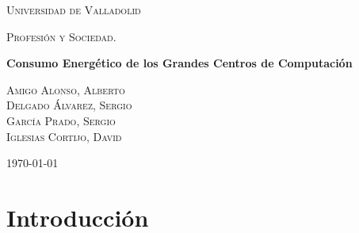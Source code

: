 \documentclass[10pt]{article}
\begin{document}
	\begin{titlepage}
      \centering
          {\scshape\LARGE Universidad de Valladolid \par}
          \vspace{1cm}
          {\scshape\Large Profesión y Sociedad.\par}
          \vspace{1.5cm}
          {\huge\bfseries Consumo Energético de los Grandes Centros de Computación \par}
          \vspace{2cm}
          {\large
          \textsc{Amigo Alonso, Alberto}\\[2mm] %
          \textsc{Delgado Álvarez, Sergio}\\[2mm] %
          \textsc{García Prado, Sergio}\\[2mm] %
          \textsc{Iglesias Cortijo, David}\\[2mm] %

          \vspace{-5mm}
          }

          \vfill
		{\large \today\par}
	\end{titlepage}


	\clearpage
	\tableofcontents


	\clearpage
    \section{Introducción}
	\label{sec:introducion}

        \paragraph{}
\end{document}
